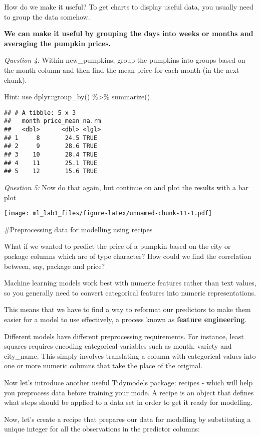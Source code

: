\documentclass[
]{article}
\begin{document}
How do we make it useful? To get charts to display useful data, you
usually need to group the data somehow.

\textbf{We can make it useful by grouping the days into weeks or months
and averaging the pumpkin prices.}

\emph{Question 4:} Within new\_pumpkins, group the pumpkins into groups
based on the month column and then find the mean price for each month
(in the next chunk).

Hint: use dplyr::group\_by() \%\textgreater\% summarize()

\begin{verbatim}
## # A tibble: 5 x 3
##   month price_mean na.rm
##   <dbl>      <dbl> <lgl>
## 1     8       24.5 TRUE 
## 2     9       28.6 TRUE 
## 3    10       28.4 TRUE 
## 4    11       25.1 TRUE 
## 5    12       15.6 TRUE
\end{verbatim}

\emph{Question 5:} Now do that again, but continue on and plot the
results with a bar plot

\texttt{[image: ml\_lab1\_files/figure-latex/unnamed-chunk-11-1.pdf]}

\#Preprocessing data for modelling using recipes

What if we wanted to predict the price of a pumpkin based on the city or
package columns which are of type character? How could we find the
correlation between, say, package and price?

Machine learning models work best with numeric features rather than text
values, so you generally need to convert categorical features into
numeric representations.

This means that we have to find a way to reformat our predictors to make
them easier for a model to use effectively, a process known as
\textbf{feature engineering}.

Different models have different preprocessing requirements. For
instance, least squares requires encoding categorical variables such as
month, variety and city\_name. This simply involves translating a column
with categorical values into one or more numeric columns that take the
place of the original.

Now let's introduce another useful Tidymodels package: recipes - which
will help you preprocess data before training your mode. A recipe is an
object that defines what steps should be applied to a data set in order
to get it ready for modelling.

Now, let's create a recipe that prepares our data for modelling by
substituting a unique integer for all the observations in the predictor
columns:
\end{document}
